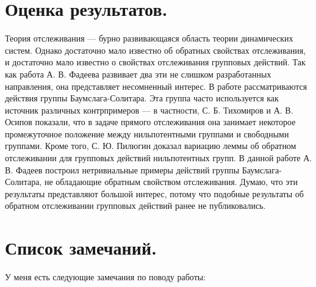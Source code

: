 \documentclass[12pt]{article}
\begin{document}
\section{Оценка результатов.}

Теория отслеживания --- бурно развивающаяся область теории динамических систем.
Однако достаточно мало известно об обратных свойствах отслеживания, и достаточно мало известно о свойствах отслеживания групповых действий. Так как работа А. В. Фадеева развивает два эти не слишком разработанных направления, она представляет несомненный интерес. В работе рассматриваются действия группы Баумслага-Солитара. Эта группа часто используется как источник различных контрпримеров --- в частности, С. Б. Тихомиров и А. В. Осипов показали, что в задаче прямого отслеживания она занимает некоторое промежуточное положение между нильпотентными группами и свободными группами. Кроме того, С. Ю. Пилюгин доказал вариацию леммы об обратном отслеживании для групповых действий нильпотентных групп. В данной работе А. В. Фадеев построил нетривиальные примеры действий группы Баумслага-Солитара, не обладающие обратным свойством отслеживания. Думаю, что эти результаты представляют большой интерес, потому что подобные результаты об обратном отслеживании групповых действий ранее не публиковались.

\section{Список замечаний.}

У меня есть следующие замечания по поводу работы:
\end{document}
